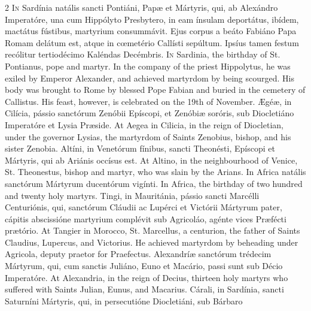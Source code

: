 \begin{paracol}{2}
\lettrine[lines=2]{I}{n} Sardínia natális 
 sancti Pontiáni, Papæ et Mártyris, qui, ab Alexándro Imperatóre, una cum 
 Hippólyto Presbytero, in eam ínsulam deportátus, ibídem, mactátus fústibus, 
 martyrium consummávit. Ejus corpus a beáto Fabiáno Papa Romam delátum 
 est, atque in cœmetério Callísti sepúltum. Ipsíus tamen festum 
 recólitur tertiodécimo Kaléndas Decémbris.
\switchcolumn
{}
\lettrine[lines=2]{I}{n} Sardinia, the birthday of St. 
 Pontianus, pope and martyr. In the company of the priest Hippolytus, he 
 was exiled by Emperor Alexander, and achieved martyrdom by being scourged. 
 His body was brought to Rome by blessed Pope Fabian and buried in the 
 cemetery of Callistus. His feast, however, is celebrated on the 19th 
 of November.
\switchcolumn*
{}
Ægéæ, in Cilícia, pássio sanctórum Zenóbii Epíscopi, et Zenóbiæ soróris, sub Diocletiáno 
 Imperatóre et Lysia Præside.
\switchcolumn
{}
At Aegea in Cilicia, in the reign of 
 Diocletian, under the governor Lysias, the martyrdom of Saints Zenobius, 
 bishop, and his sister Zenobia.
\switchcolumn*
{}
Altíni, in Venetórum 
 fínibus, sancti Theonésti, Epíscopi et Mártyris, qui ab Ariánis occísus est.
\switchcolumn
{}
At Altino, in the neighbourhood of 
 Venice, St. Theonestus, bishop and martyr, who was slain by the Arians.
\switchcolumn*
{}
In Africa natális 
 sanctórum Mártyrum ducentórum vigínti.
\switchcolumn
{}
In Africa, the birthday of two 
 hundred and twenty holy martyrs.
\switchcolumn*
{}
Tingi, in Mauritánia, pássio sancti Marcélli Centuriónis, qui, sanctórum Cláudii ac Lupérci et 
 Victórii Mártyrum pater, cápitis abscissióne martyrium complévit sub 
 Agricoláo, agénte vices Præfécti prætório.
\switchcolumn
{}
At Tangier in Morocco, St. 
 Marcellus, a centurion, the father of Saints Claudius, Lupercus, and 
 Victorius. He achieved martyrdom by beheading under Agricola, deputy 
 praetor for Praefectus.
\switchcolumn*
{}
Alexandríæ sanctórum 
 trédecim Mártyrum, qui, cum sanctis Juliáno, Euno et Macário, passi sunt sub 
 Décio Imperatóre.
\switchcolumn
{}
At Alexandria, in the reign of 
 Decius, thirteen holy martyrs who suffered with Saints Julian, Eunus, and 
 Macarius.
\switchcolumn*
{}
Cárali, in Sardínia, sancti Saturníni Mártyris, qui, in persecutióne Diocletiáni, sub Bárbaro 

\end{paracol}
